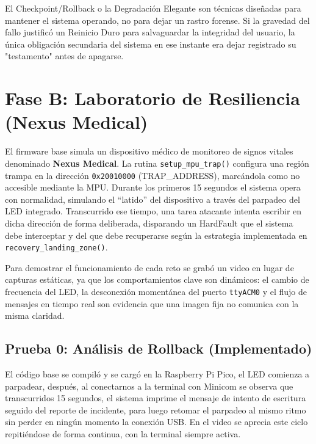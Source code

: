 \documentclass[12pt,letterpaper]{article}
\begin{document}
El Checkpoint/Rollback o la Degradación Elegante son técnicas diseñadas para mantener el sistema operando,
no para dejar un rastro forense. Si la gravedad del fallo justificó un Reinicio Duro para salvaguardar la
integridad del usuario, la única obligación secundaria del sistema en ese instante era dejar registrado su
"testamento" antes de apagarse.


\newpage


\section*{Fase B: Laboratorio de Resiliencia (Nexus Medical)}
 
El firmware base simula un dispositivo médico de monitoreo de signos vitales denominado
\textbf{Nexus Medical}. La rutina \texttt{setup\_mpu\_trap()} configura una región trampa en
la dirección \texttt{0x20010000} (TRAP\_ADDRESS), marcándola como no accesible mediante la
MPU. Durante los primeros 15 segundos el sistema opera con normalidad, simulando el
``latido'' del dispositivo a través del parpadeo del LED integrado. Transcurrido ese tiempo,
una tarea atacante intenta escribir en dicha dirección de forma deliberada, disparando un
HardFault que el sistema debe interceptar y del que debe recuperarse según la estrategia
implementada en \texttt{recovery\_landing\_zone()}.
 
Para demostrar el funcionamiento de cada reto se grabó un video en lugar de capturas
estáticas, ya que los comportamientos clave son dinámicos: el cambio de frecuencia del LED,
la desconexión momentánea del puerto \texttt{ttyACM0} y el flujo de mensajes en tiempo real
son evidencia que una imagen fija no comunica con la misma claridad.
 
\subsection*{Prueba 0: Análisis de Rollback (Implementado)}
 
El código base se compiló y se cargó en la Raspberry Pi Pico, el LED comienza a parpadear, después, al
conectarnos a la terminal con Minicom se observa que transcurridos 15 segundos, el sistema imprime el mensaje de
intento de escritura seguido del reporte de incidente, para luego retomar el parpadeo al mismo ritmo sin perder
en ningún momento la conexión USB. En el video se aprecia este ciclo repitiéndose de forma continua, con la
terminal siempre activa.
 
\end{document}
